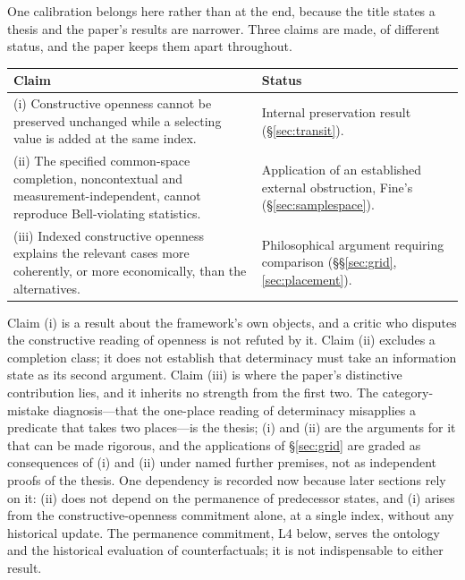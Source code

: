 \noindent One calibration belongs here rather than at the end, because the title states a thesis and the paper's results are narrower. Three claims are made, of different status, and the paper keeps them apart throughout.
\begin{center}\small
\begin{tabular}{p{} p{}}
\toprule
\textbf{Claim} & \textbf{Status} \\
\midrule
(i) Constructive openness cannot be preserved unchanged while a selecting value is added at the same index. & Internal preservation result (\S\ref{sec:transit}). \\
(ii) The specified common-space completion, noncontextual and measurement-independent, cannot reproduce Bell-violating statistics. & Application of an established external obstruction, Fine's (\S\ref{sec:samplespace}). \\
(iii) Indexed constructive openness explains the relevant cases more coherently, or more economically, than the alternatives. & Philosophical argument requiring comparison (\S\S\ref{sec:grid}, \ref{sec:placement}). \\
\bottomrule
\end{tabular}
\end{center}
\noindent Claim (i) is a result about the framework's own objects, and a critic who disputes the constructive reading of openness is not refuted by it. Claim (ii) excludes a completion class; it does not establish that determinacy must take an information state as its second argument. Claim (iii) is where the paper's distinctive contribution lies, and it inherits no strength from the first two. The category-mistake diagnosis---that the one-place reading of determinacy misapplies a predicate that takes two places---is the thesis; (i) and (ii) are the arguments for it that can be made rigorous, and the applications of \S\ref{sec:grid} are graded as consequences of (i) and (ii) under named further premises, not as independent proofs of the thesis. One dependency is recorded now because later sections rely on it: (ii) does not depend on the permanence of predecessor states, and (i) arises from the constructive-openness commitment alone, at a single index, without any historical update. The permanence commitment, L4 below, serves the ontology and the historical evaluation of counterfactuals; it is not indispensable to either result.



